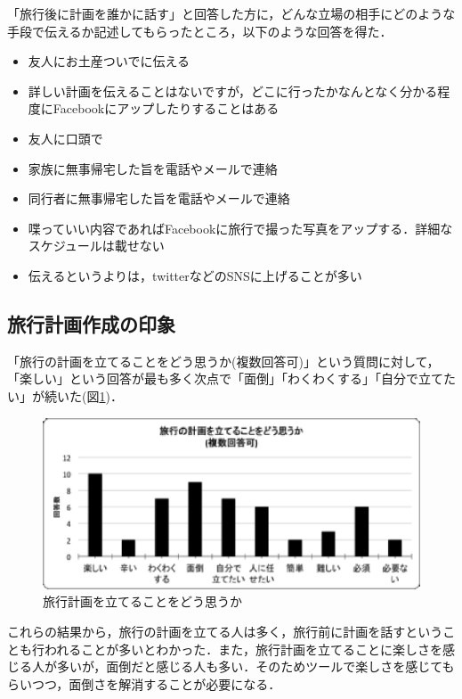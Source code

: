 \documentclass{funthesis}
\begin{document}
「旅行後に計画を誰かに話す」と回答した方に，どんな立場の相手にどのような手段で伝えるか記述してもらったところ，以下のような回答を得た．
\begin{itemize}
 \item 友人にお土産ついでに伝える
 \item 詳しい計画を伝えることはないですが，どこに行ったかなんとなく分かる程度にFacebookにアップしたりすることはある
 \item 友人に口頭で
 \item 家族に無事帰宅した旨を電話やメールで連絡
 \item 同行者に無事帰宅した旨を電話やメールで連絡
 \item 喋っていい内容であればFacebookに旅行で撮った写真をアップする．詳細なスケジュールは載せない
 \item 伝えるというよりは，twitterなどのSNSに上げることが多い
\end{itemize}



\subsection{旅行計画作成の印象}

「旅行の計画を立てることをどう思うか(複数回答可)」という質問に対して，「楽しい」という回答が最も多く次点で「面倒」「わくわくする」「自分で立てたい」が続いた(図\ref{Lhowthinktrip})．


\begin{figure}[htpb]
\begin{center}
\includegraphics[scale=0.7]{howthinktrip.eps}
\end{center}
\caption{旅行計画を立てることをどう思うか}
\label{Lhowthinktrip}
\end{figure}

これらの結果から，旅行の計画を立てる人は多く，旅行前に計画を話すということも行われることが多いとわかった．また，旅行計画を立てることに楽しさを感じる人が多いが，面倒だと感じる人も多い．そのためツールで楽しさを感じてもらいつつ，面倒さを解消することが必要になる．\\
\end{document}
